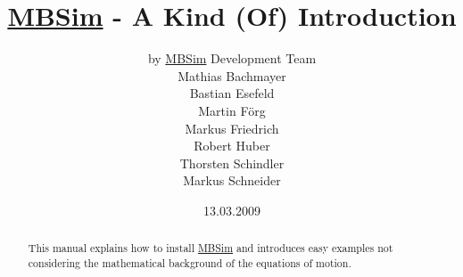 \documentclass[a4,english]{AMpaper}
\newcommand{\MBSim}{\href{http://mbsim.berlios.de}{\textsf{MBSim}}}
\begin{document}
\title{\MBSim{} - A Kind (Of) Introduction}
\author{by \MBSim{} Development Team\\
  Mathias Bachmayer\\
  Bastian Esefeld\\
  Martin F\"org\\
  Markus Friedrich\\
  Robert Huber\\
  Thorsten Schindler\\
  Markus Schneider}
\date{13.03.2009}
\maketitle

\begin{abstract}
  This manual explains how to install \MBSim{} and introduces easy examples not considering the mathematical background of the equations of motion.
\end{abstract}

\noindent\hrulefill
\tableofcontents



%


%
%




\end{document}

